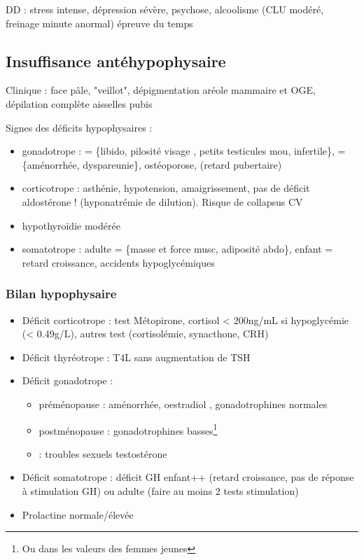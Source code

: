 \documentclass[11pt]{article}
\begin{document}
DD : stress intense, dépression sévère, psychose, alcoolisme (CLU modéré,
  freinage minute anormal) \thus épreuve du temps 

\subsection{Insuffisance antéhypophysaire}
\label{sec:orge357c56}
Clinique : face pâle, "veillot", dépigmentation aréole mammaire et OGE,
dépilation complète aisselles pubis

Signes des déficits hypophysaires :
\begin{itemize}
\item gonadotrope : \male = \{\dec libido, pilosité visage \dec, petits
testicules mou, infertile\}, \female = \{aménorrhée, dyspareunie\}, ostéoporose,
(retard pubertaire)
\item corticotrope : asthénie, hypotension, amaigrissement, pas de déficit
aldostérone ! (hyponatrémie de dilution). Risque de collapsus CV
\item hypothyroïdie modérée
\item somatotrope : adulte = \{\dec masse et force musc, adiposité abdo\}, enfant =
retard croissance, accidents hypoglycémiques
\end{itemize}

\subsubsection{Bilan hypophysaire}
\label{sec:orgb25ccec}


\begin{itemize}
\item Déficit corticotrope : test Métopirone, cortisol < 200ng/mL si hypoglycémie (<
0.49g/L), autres test (cortisolémie, synacthone, CRH)
\item Déficit thyréotrope  : \dec{} T4L sans augmentation de TSH
\item Déficit gonadotrope : 
\begin{itemize}
\item \female{} préménopause : aménorrhée, oestradiol \dec, gonadotrophines
normales
\item \female{} postménopause  : gonadotrophines basses\footnote{Ou dans les valeurs des femmes jeunes}
\item \male{} : troubles sexuels \dec testostérone
\end{itemize}
\item Déficit somatotrope : déficit GH enfant++ (retard croissance, pas de réponse
à stimulation GH) ou adulte (faire au moins 2 tests stimulation)
\item Prolactine normale/élevée
\end{itemize}
\end{document}
